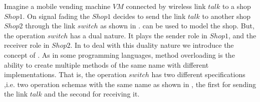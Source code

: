 Imagine a mobile vending machine $VM$ connected by wireless link $talk$ to a shop $Shop1$. On signal fading the $Shop1$ decides to send the link $talk$ to another shop $Shop2$ through the link $switch$ as shown in . \oz{} can be used to model the shop. But, the operation $switch$ has a dual nature. It plays the sender role in $Shop1$, and the receiver role in $Shop2$.
 In \oz{} to deal with this duality nature we introduce the concept of . As in some programming languages, method overloading is the ability to create multiple methods of the same name with different implementations. That is, the operation $switch$ has two different specifications ,i.e. two operation schemas with the same name as shown in , the first for sending the link $talk$ and the second for receiving it.




